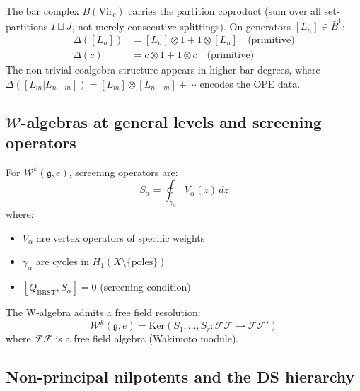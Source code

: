 \begin{example}
The bar complex $\bar{B}(\mathrm{Vir}_c)$ carries the partition coproduct (sum over all set-partitions $I \sqcup J$, not merely consecutive splittings). On generators $[L_n] \in \bar{B}^1$:
\begin{align}
\Delta([L_n]) &= [L_n] \otimes 1 + 1 \otimes [L_n] \quad \text{(primitive)}\\
\Delta(c) &= c \otimes 1 + 1 \otimes c \quad \text{(primitive)}
\end{align}
The non-trivial coalgebra structure appears in higher bar degrees, where $\Delta([L_m | L_{n-m}]) = [L_m] \otimes [L_{n-m}] + \cdots$ encodes the OPE data.
\end{example}

\subsection{$\mathcal{W}$-algebras at general levels and screening operators}

\begin{definition}\label{def:screening}
For $\mathcal{W}^k(\mathfrak{g}, e)$, screening operators are:
\[
S_{\alpha} = \oint_{\gamma_\alpha} V_\alpha(z) \, dz
\]
where:
\begin{itemize}
\item $V_\alpha$ are vertex operators of specific weights
\item $\gamma_\alpha$ are cycles in $H_1(X \setminus \{\text{poles}\})$
\item $[Q_{\mathrm{BRST}}, S_\alpha] = 0$ (screening condition)
\end{itemize}
\end{definition}

\begin{theorem}\label{thm:screen-res}
The W-algebra admits a free field resolution:
\[
\mathcal{W}^k(\mathfrak{g}, e) = \mathrm{Ker}(S_1, \ldots, S_r : \mathcal{FF} \to \mathcal{FF}')
\]
where $\mathcal{FF}$ is a free field algebra (Wakimoto module).
\end{theorem}

\subsection{Non-principal nilpotents and the DS hierarchy}
\label{sec:non-principal-ds}

